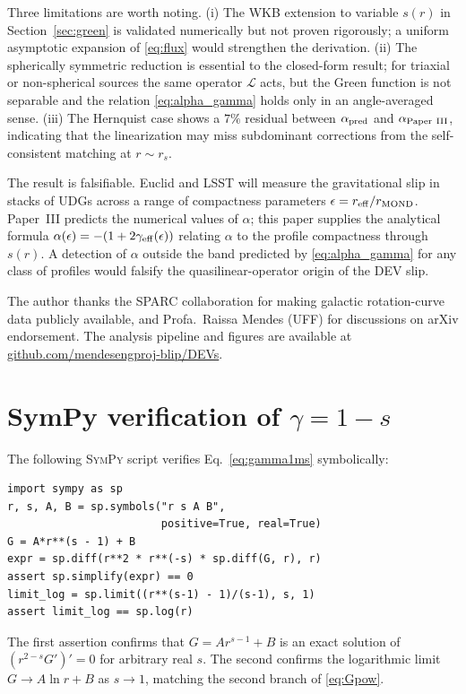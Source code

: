 \documentclass[aps,prd,twocolumn,superscriptaddress,nofootinbib]{revtex4-2}
\begin{document}
Three limitations are worth noting. (i) The WKB extension to
variable $s(r)$ in Section~\ref{sec:green} is validated numerically
but not proven rigorously; a uniform asymptotic expansion of
\eqref{eq:flux} would strengthen the derivation. (ii) The
spherically symmetric reduction is essential to the closed-form
result; for triaxial or non-spherical sources the same operator
$\mathcal{L}$ acts, but the Green function is not separable and the
relation \eqref{eq:alpha_gamma} holds only in an angle-averaged sense.
(iii) The Hernquist case shows a $7\%$ residual between
$\alpha_{\rm pred}$ and $\alpha_{\rm Paper~III}$, indicating that
the linearization may miss subdominant corrections from the
self-consistent matching at $r\sim r_s$.

The result is falsifiable. Euclid and LSST will measure the
gravitational slip in stacks of UDGs across a range of compactness
parameters $\epsilon = r_{\rm eff}/r_{\rm MOND}$. Paper~III
predicts the numerical values of $\alpha$; this paper supplies the
analytical formula $\alpha(\epsilon) = -(1 + 2\gamma_{\rm eff}(\epsilon))$
relating $\alpha$ to the profile compactness through $s(r)$. A
detection of $\alpha$ outside the band predicted by
\eqref{eq:alpha_gamma} for any class of profiles would falsify the
quasilinear-operator origin of the DEV slip.

\begin{acknowledgments}
The author thanks the SPARC collaboration for making galactic
rotation-curve data publicly available, and Profa.\ Raissa Mendes
(UFF) for discussions on arXiv endorsement. The analysis pipeline
and figures are available at
\href{https://github.com/mendesengproj-blip/DEVs}{github.com/mendesengproj-blip/DEVs}.
\end{acknowledgments}

\appendix

\section{SymPy verification of $\gamma = 1-s$}\label{app:sympy}

The following \textsc{SymPy} script verifies
Eq.~\eqref{eq:gamma1ms} symbolically:
\begin{verbatim}
import sympy as sp
r, s, A, B = sp.symbols("r s A B",
                        positive=True, real=True)
G = A*r**(s - 1) + B
expr = sp.diff(r**2 * r**(-s) * sp.diff(G, r), r)
assert sp.simplify(expr) == 0
limit_log = sp.limit((r**(s-1) - 1)/(s-1), s, 1)
assert limit_log == sp.log(r)
\end{verbatim}
The first assertion confirms that $G = A r^{s-1} + B$ is an exact
solution of $(r^{2-s} G')' = 0$ for arbitrary real $s$. The second
confirms the logarithmic limit $G\to A\ln r + B$ as $s\to 1$,
matching the second branch of \eqref{eq:Gpow}.
\end{document}
